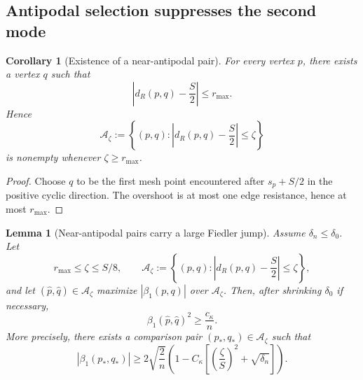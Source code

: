 \documentclass[11pt]{article}
\numberwithin{equation}{section}
\newtheorem{lemma}[theorem]{Lemma}
\newtheorem{corollary}[theorem]{Corollary}
\theoremstyle{definition}
\theoremstyle{remark}
\begin{document}
\subsection{Antipodal selection suppresses the second mode}

\begin{corollary}[Existence of a near-antipodal pair]\label{cor:near_antipodal_det}
	For every vertex $p$, there exists a vertex $q$ such that
	\[
	\left|d_R(p,q)-\frac S2\right|\le r_{\max}.
	\]
	Hence
	\[
	\mathcal A_\zeta:=
	\left\{
	(p,q):\left|d_R(p,q)-\frac S2\right|\le \zeta
	\right\}
	\]
	is nonempty whenever $\zeta\ge r_{\max}$.
\end{corollary}

\begin{proof}
	Choose $q$ to be the first mesh point encountered after $s_p+S/2$ in
	the positive cyclic direction. The overshoot is at most one edge
	resistance, hence at most $r_{\max}$.
\end{proof}

\begin{lemma}[Near-antipodal pairs carry a large Fiedler jump]\label{lem:beta1_lower_disc}
	Assume $\delta_n\le \delta_0$. Let
	\[
	r_{\max}\le \zeta\le S/8,
	\qquad
	\mathcal A_\zeta:=
	\left\{
	(p,q):\left|d_R(p,q)-\frac S2\right|\le \zeta
	\right\},
	\]
	and let $(\widehat p,\widehat q)\in \mathcal A_\zeta$ maximize
	$|\beta_1(p,q)|$ over $\mathcal A_\zeta$. Then, after shrinking
	$\delta_0$ if necessary,
	\begin{equation}\label{eq:beta1_lower_disc}
		\beta_1(\widehat p,\widehat q)^2\ge \frac{c_\kappa}{n}.
	\end{equation}
	More precisely, there exists a comparison pair $(p_*,q_*)\in\mathcal A_\zeta$
	such that
	\begin{equation}\label{eq:beta1_comparison_pair}
		|\beta_1(p_*,q_*)|
		\ge
		2\sqrt{\frac2n}
		\left(
		1-C_\kappa\left[
		\left(\frac{\zeta}{S}\right)^2+\sqrt{\delta_n}
		\right]
		\right).
	\end{equation}
\end{lemma}
\end{document}

